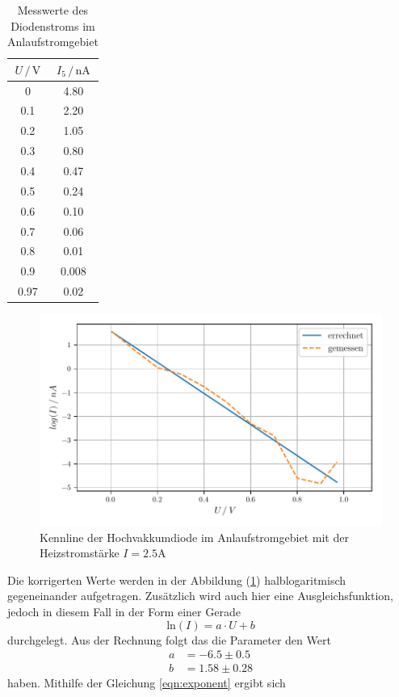 \begin{table}
  \centering
  \caption{Messwerte des Diodenstroms im Anlaufstromgebiet}
  \label{tab:mess2}
  \begin{tabular}{c c}
  \toprule
  $ U \,/\, \si{\volt} $ & $I_5 \,/\, \si{\nano\ampere}$\\
  \midrule 
  0    &  4.80 \\
  0.1  &  2.20 \\
  0.2  &  1.05 \\
  0.3  &  0.80 \\
  0.4  &  0.47 \\
  0.5  &  0.24 \\
  0.6  &  0.10 \\
  0.7  &  0.06 \\
  0.8  &  0.01 \\
  0.9  &  0.008 \\
  0.97 &  0.02 \\
  \bottomrule
  \end{tabular}
\end{table}


\begin{figure} [H]
    \centering
    \includegraphics{Daten/gegenfeld.pdf}
    \caption{Kennline der Hochvakkumdiode im Anlaufstromgebiet mit der Heizstromstärke $I = 2.5 \si{\ampere}$}
    \label{fig:3}
\end{figure}


Die korrigerten Werte werden in der Abbildung (\ref{fig:3}) halblogaritmisch gegeneinander aufgetragen. Zusätzlich wird auch hier eine Ausgleichsfunktion, jedoch in diesem Fall in der
Form einer Gerade 
\begin{equation*}
    \text{ln} \left(I \right) = a \cdot U + b
\end{equation*}
durchgelegt. Aus der Rechnung folgt das die Parameter den Wert
\begin{align*}
    a &= -6.5 \pm 0.5\\
    b &= 1.58 \pm 0.28
\end{align*}
haben. Mithilfe der Gleichung \eqref{eqn:exponent} ergibt sich

